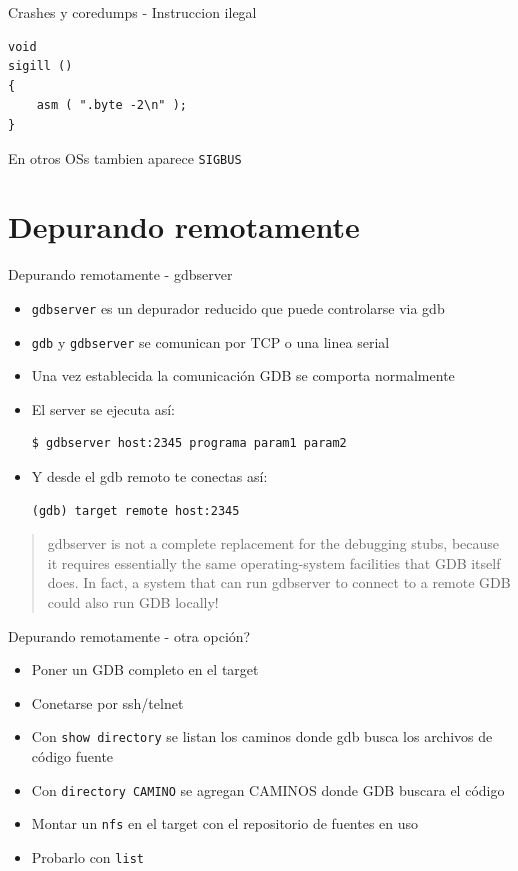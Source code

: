 \documentclass[xetex]{beamer}
\begin{document}
\begin{frame}[fragile]{Crashes y coredumps - Instruccion ilegal}
\begin{lstlisting}
void
sigill ()
{
    asm ( ".byte -2\n" );
}
\end{lstlisting}
En otros OSs tambien aparece \verb=SIGBUS=
\end{frame}




\section{Depurando remotamente}
\begin{frame}[fragile]{Depurando remotamente - gdbserver}
\begin{itemize}
\item \verb=gdbserver= es un depurador reducido que puede controlarse via gdb
\item \verb=gdb= y \verb=gdbserver= se comunican por TCP o una linea serial
\item Una vez establecida la comunicación GDB se comporta normalmente
\item El server se ejecuta así:
\begin{verbatim}
$ gdbserver host:2345 programa param1 param2
\end{verbatim}
\item Y desde el gdb remoto te conectas así:
\begin{verbatim}
(gdb) target remote host:2345 
\end{verbatim}
\end{itemize}
\begin{quotation}
gdbserver is not a complete replacement for the debugging stubs, because it requires essentially the same operating-system facilities that GDB itself does. In fact, a system that can run gdbserver to connect to a remote GDB could also run GDB locally!
\end{quotation}
\end{frame}

\begin{frame}[fragile]{Depurando remotamente - otra opción?}
\begin{itemize}
\item Poner un GDB completo en el target
\item Conetarse por ssh/telnet
\item Con \verb=show directory= se listan los caminos donde gdb busca los archivos de código fuente
\item Con \verb=directory CAMINO= se agregan CAMINOS donde GDB buscara el código
\item Montar un \verb=nfs= en el target con el repositorio de fuentes en uso
\item Probarlo con \verb=list=
\end{itemize}
\end{frame}
\end{document}
